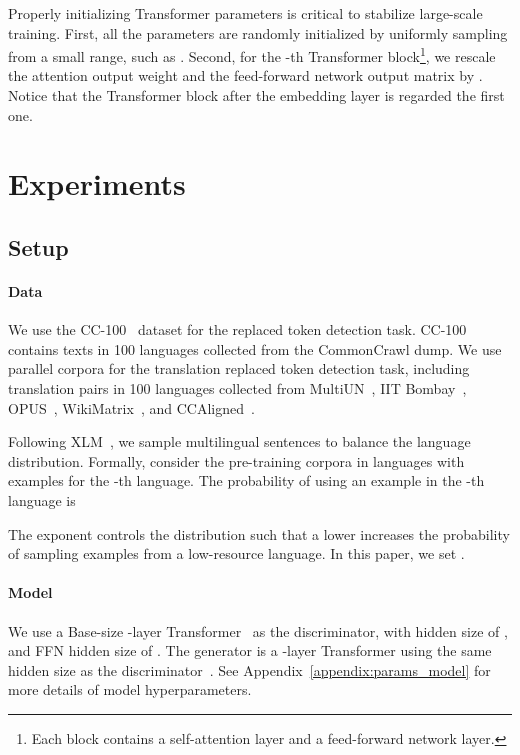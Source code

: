 \documentclass[11pt]{article}
\begin{document}
Properly initializing Transformer parameters is critical to stabilize large-scale training.
First, all the parameters are randomly initialized by uniformly sampling from a small range, such as .
Second, for the -th Transformer block\footnote{Each block contains a self-attention layer and a feed-forward network layer.}, we rescale the attention output weight and the feed-forward network output matrix by . Notice that the Transformer block after the embedding layer is regarded the first one.


\section{Experiments}
\label{sec:exp}

\subsection{Setup}

\paragraph{Data}

We use the CC-100~\cite{xlmr} dataset for the replaced token detection task. CC-100 contains texts in 100 languages collected from the CommonCrawl dump. We use parallel corpora for the translation replaced token detection task, including translation pairs in 100 languages collected from MultiUN~\cite{multiun}, IIT Bombay~\cite{iit}, OPUS~\cite{opus}, WikiMatrix~\cite{wikimatrix}, and CCAligned~\cite{el2019ccaligned}.

Following XLM~\cite{xlm}, we sample multilingual sentences to balance the language distribution. Formally, consider the pre-training corpora in  languages with  examples for the -th language.
The probability of using an example in the -th language is

The exponent  controls the distribution such that a lower  increases the probability of sampling examples from a low-resource language. In this paper, we set .

\paragraph{Model}

We use a Base-size -layer Transformer~\cite{transformer} as the discriminator, with hidden size of , and FFN hidden size of .
The generator is a -layer Transformer using the same hidden size as the discriminator~\cite{cocolm}.
See Appendix~\ref{appendix:params_model} for more details of model hyperparameters.
\end{document}
